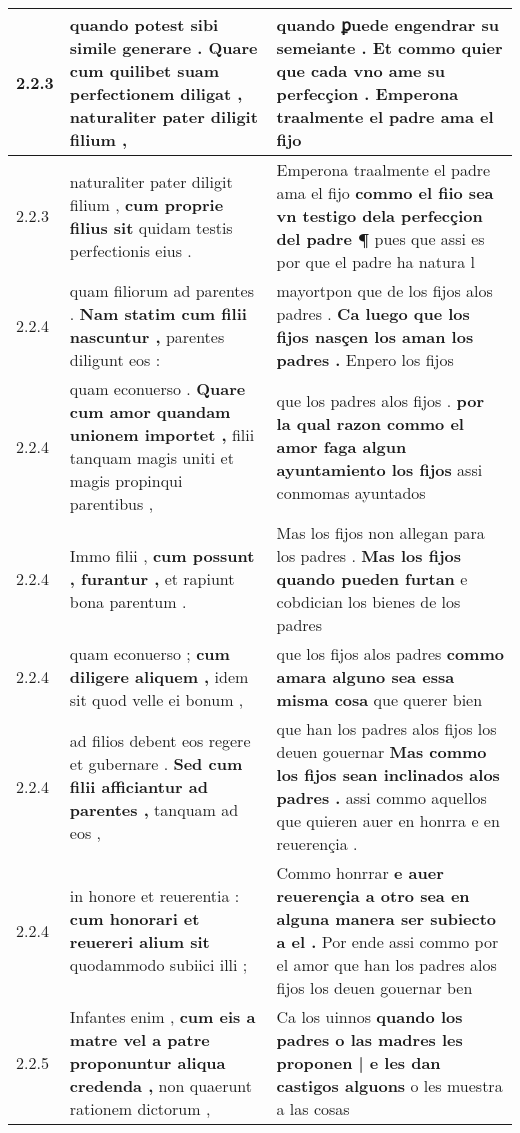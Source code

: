 \begin{tabular}{|p{1cm}|p{6.5cm}|p{6.5cm}|}
2.2.3 & quando potest sibi simile generare . \textbf{ Quare cum quilibet suam perfectionem diligat , } naturaliter pater diligit filium , & quando ꝑuede engendrar su semeiante . \textbf{ Et commo quier que cada vno ame su perfecçion . } Emperona traalmente el padre ama el fijo \\\hline
2.2.3 & naturaliter pater diligit filium , \textbf{ cum proprie filius sit } quidam testis perfectionis eius . & Emperona traalmente el padre ama el fijo \textbf{ commo el fiio sea vn testigo dela perfecçion del padre ¶ } pues que assi es por que el padre ha natura l \\\hline
2.2.4 & quam filiorum ad parentes . \textbf{ Nam statim cum filii nascuntur , } parentes diligunt eos : & mayortpon que de los fijos alos padres . \textbf{ Ca luego que los fijos nasçen los aman los padres . } Enpero los fijos \\\hline
2.2.4 & quam econuerso . \textbf{ Quare cum amor quandam unionem importet , } filii tanquam magis uniti et magis propinqui parentibus , & que los padres alos fijos . \textbf{ por la qual razon commo el amor faga algun ayuntamiento los fijos } assi conmomas ayuntados \\\hline
2.2.4 & Immo filii , \textbf{ cum possunt , furantur , } et rapiunt bona parentum . & Mas los fijos non allegan para los padres . \textbf{ Mas los fijos quando pueden furtan } e cobdician los bienes de los padres \\\hline
2.2.4 & quam econuerso ; \textbf{ cum diligere aliquem , } idem sit quod velle ei bonum , & que los fijos alos padres \textbf{ commo amara alguno sea essa misma cosa } que querer bien \\\hline
2.2.4 & ad filios debent eos regere et gubernare . \textbf{ Sed cum filii afficiantur ad parentes , } tanquam ad eos , & que han los padres alos fijos los deuen gouernar \textbf{ Mas commo los fijos sean inclinados alos padres . } assi commo aquellos que quieren auer en honrra e en reuerençia . \\\hline
2.2.4 & in honore et reuerentia : \textbf{ cum honorari et reuereri alium sit } quodammodo subiici illi ; & Commo honrrar \textbf{ e auer reuerençia a otro sea en alguna manera ser subiecto a el . } Por ende assi commo por el amor que han los padres alos fijos los deuen gouernar ben \\\hline
2.2.5 & Infantes enim , \textbf{ cum eis a matre vel a patre proponuntur aliqua credenda , } non quaerunt rationem dictorum , & Ca los uinnos \textbf{ quando los padres o las madres les proponen | e les dan castigos alguons } o les muestra a las cosas \\\hline

\end{tabular}
